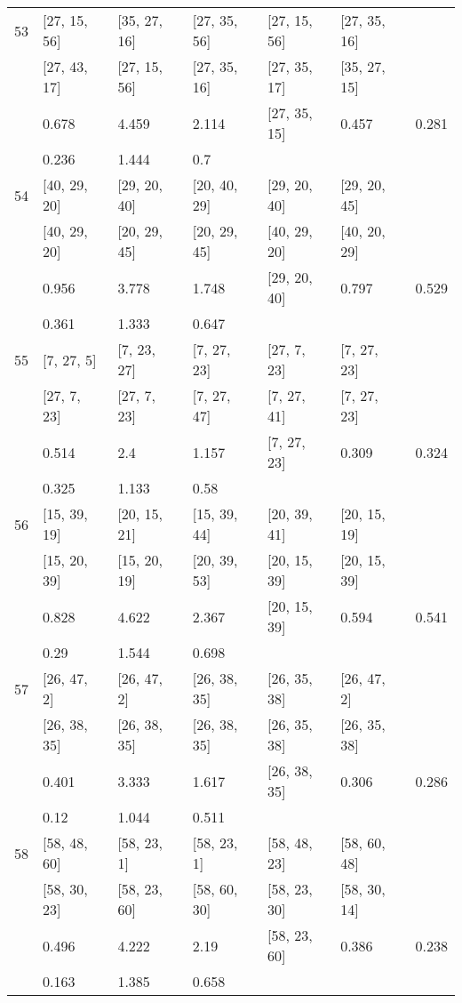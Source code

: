 \begin{longtable}{| l || l | l | l | l | l | l | }
\hline
53  & [27, 15, 56] & [35, 27, 16] & [27, 35, 56] & [27, 15, 56] & [27, 35, 16] \\
 & [27, 43, 17] & [27, 15, 56] & [27, 35, 16] & [27, 35, 17] & [35, 27, 15]\\
\hline
& 0.678 & 4.459 & 2.114 & [27, 35, 15] & 0.457 & 0.281\\
\hline
& 0.236 & 1.444 & 0.7 \\
\hline

\hline
54  & [40, 29, 20] & [29, 20, 40] & [20, 40, 29] & [29, 20, 40] & [29, 20, 45] \\
 & [40, 29, 20] & [20, 29, 45] & [20, 29, 45] & [40, 29, 20] & [40, 20, 29]\\
\hline
& 0.956 & 3.778 & 1.748 & [29, 20, 40] & 0.797 & 0.529\\
\hline
& 0.361 & 1.333 & 0.647 \\
\hline

\hline
55  & [7, 27, 5] & [7, 23, 27] & [7, 27, 23] & [27, 7, 23] & [7, 27, 23] \\
 & [27, 7, 23] & [27, 7, 23] & [7, 27, 47] & [7, 27, 41] & [7, 27, 23]\\
\hline
& 0.514 & 2.4 & 1.157 & [7, 27, 23] & 0.309 & 0.324\\
\hline
& 0.325 & 1.133 & 0.58 \\
\hline

\hline
56  & [15, 39, 19] & [20, 15, 21] & [15, 39, 44] & [20, 39, 41] & [20, 15, 19] \\
 & [15, 20, 39] & [15, 20, 19] & [20, 39, 53] & [20, 15, 39] & [20, 15, 39]\\
\hline
& 0.828 & 4.622 & 2.367 & [20, 15, 39] & 0.594 & 0.541\\
\hline
& 0.29 & 1.544 & 0.698 \\
\hline

\hline
57  & [26, 47, 2] & [26, 47, 2] & [26, 38, 35] & [26, 35, 38] & [26, 47, 2] \\
 & [26, 38, 35] & [26, 38, 35] & [26, 38, 35] & [26, 35, 38] & [26, 35, 38]\\
\hline
& 0.401 & 3.333 & 1.617 & [26, 38, 35] & 0.306 & 0.286\\
\hline
& 0.12 & 1.044 & 0.511 \\
\hline

\hline
58  & [58, 48, 60] & [58, 23, 1] & [58, 23, 1] & [58, 48, 23] & [58, 60, 48] \\
 & [58, 30, 23] & [58, 23, 60] & [58, 60, 30] & [58, 23, 30] & [58, 30, 14]\\
\hline
& 0.496 & 4.222 & 2.19 & [58, 23, 60] & 0.386 & 0.238\\
\hline
& 0.163 & 1.385 & 0.658 \\
\hline


\end{longtable}
